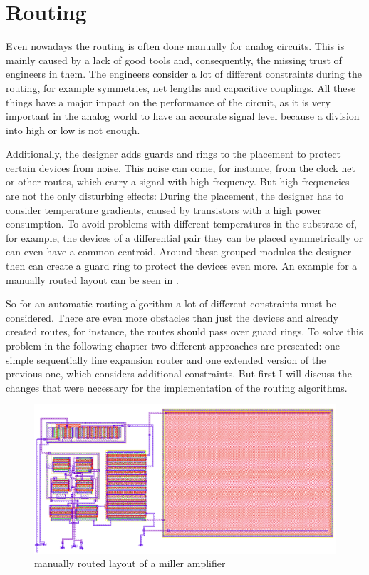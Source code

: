 \chapter{Routing}

Even nowadays the routing is often done manually for analog circuits. This is mainly caused by a lack of good tools and, consequently, the missing trust of engineers in them. The engineers consider a lot of different constraints during the routing, for example symmetries, net lengths and capacitive couplings. All these things have a major impact on the performance of the circuit, as it is very important in the analog world to have an accurate signal level because a division into high or low is not enough.

Additionally, the designer adds guards and rings to the placement to protect certain devices from noise. This noise can come, for instance, from the clock net or other routes, which carry a signal with high frequency. But high frequencies are not the only disturbing effects: During the placement, the designer has to consider temperature gradients, caused by transistors with a high power consumption. To avoid problems with different temperatures in the substrate of, for example, the devices of a differential pair they can be placed symmetrically or can even have a common centroid. Around these grouped modules the designer then can create a guard ring to protect the devices even more. An example for a manually routed layout can be seen in .

So for an automatic routing algorithm a lot of different constraints must be considered. There are even more obstacles than just the devices and already created routes, for instance, the routes should pass over guard rings. To solve this problem in the following chapter two different approaches are presented: one simple sequentially line expansion router and one extended version of the previous one, which considers additional constraints. But first I will discuss the changes that were necessary for the implementation of the routing algorithms.

\begin{figure}
	\centering
	\includegraphics[scale=.4]{FIG/miller_amplifier_layout_routed.png}
  	\caption{manually routed layout of a miller amplifier}
	\label{fig:miller_amplifier_routed_layout}
\end{figure}

